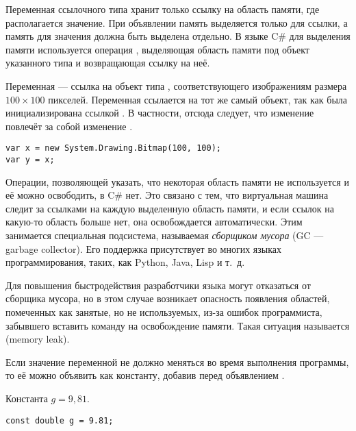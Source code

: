 Переменная ссылочного типа хранит только ссылку на область памяти, где
располагается значение. При объявлении память выделяется только для
ссылки, а память для значения должна быть выделена отдельно. В языке
C\# для выделения памяти используется операция ,
выделяющая область памяти под объект указанного типа и возвращающая
ссылку на неё.

\begin{example}
  Переменная  — ссылка на объект типа
  , соответствующего изображениям
  размера $100\times100$ пикселей.  Переменная  ссылается на
  тот же самый объект, так как была инициализирована ссылкой
  . В частности, отсюда следует, что изменение  повлечёт
  за собой изменение .

\begin{lstlisting}
var x = new System.Drawing.Bitmap(100, 100);
var y = x;
\end{lstlisting}
\end{example}


Операции, позволяющей указать, что некоторая область памяти не
используется и её можно освободить, в C\# нет. Это связано с тем, что
виртуальная машина следит за ссылками на каждую выделенную область
памяти, и если ссылок на какую-то область больше нет, она
освобождается автоматически.  Этим занимается специальная подсистема,
называемая \emph{сборщиком мусора} (GC — garbage collector). Его
поддержка присутствует во многих языках программирования, таких, как
Python, Java, Lisp и т.~д.

Для повышения быстродействия разработчики языка могут отказаться от
сборщика мусора, но в этом случае возникает опасность появления
областей, помеченных как занятые, но не используемых, из-за ошибок
программиста, забывшего вставить команду на освобождение памяти. Такая
ситуация называется  (memory
leak).



Если значение переменной не должно меняться во время выполнения
программы, то её можно объявить как константу, добавив перед
объявлением .

\begin{example}
Константа $g=9{,}81.$

\begin{lstlisting}
const double g = 9.81;
\end{lstlisting}
\end{example}

